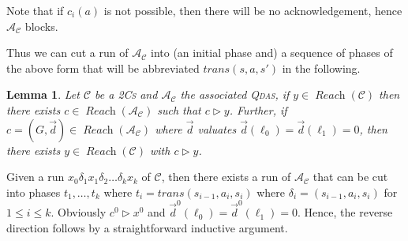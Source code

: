 \documentclass[runningheads,oribibl,]{article}
\newcommand{\Aa}{\ensuremath{\mathcal{A}}\xspace}
\newcommand{\Cc}{\ensuremath{\mathcal{C}}\xspace}
\newcommand{\qdas}{\textsc{Qdas}\xspace}
\newcommand{\twocs}{2\textsc{Cs}\xspace}
\DeclareMathOperator{\Reach}{\textit{Reach}}
\newcommand{\Graph}{\ensuremath{G}}
\newcommand{\Data}{\ensuremath{\vec{d}}}
\newtheorem{lemma}{Lemma}{}
\newenvironment{proof}{\noindent{\it Proof.\hspace*{.5cm}}}{}
\begin{document}
Note that if $c_i(a)$ is not possible, then there will be no acknowledgement,
hence $\Aa_\Cc$ blocks.

Thus we can cut a run of $\Aa_\Cc$ into (an initial phase and) a sequence of
phases of the above form that will be abbreviated $trans(s,a,s')$ in the
following.


\begin{lemma}
  Let $\Cc$ be a \twocs and $\Aa_{\Cc}$
  the associated \qdas, if  $y\in\Reach(\Cc)$ then there exists
  $c\in\Reach(\Aa_{\Cc})$ such
  that $c\triangleright y$. Further, if $c=(\Graph,\Data)\in\Reach(\Aa_\Cc)$
  where $\Data$ valuates $\Data(\ell_0)=\Data(\ell_1)=0$,
  then there exists $y\in\Reach(\Cc)$ with $c\triangleright y$.
\end{lemma}

\begin{proof}

  Given a run $x_0 \delta_1 x_1 \delta_2 \dots \delta_k x_k$ of
  $\Cc$, then there exists a run of $\Aa_\Cc$ that can be cut into
  phases $t_1,\dots,t_k$ where $t_i=trans(s_{i-1},a_i,s_i)$ where
  $\delta_i=(s_{i-1},a_i,s_i)$ for $1\leq i \leq k$.
    Obviously $c^0\triangleright x^0$ and
  $\Data^0(\ell_0)=\Data^0(\ell_1)=0$.
  Hence, the reverse direction follows by a straightforward inductive
  argument.
      \end{proof}
\end{document}
